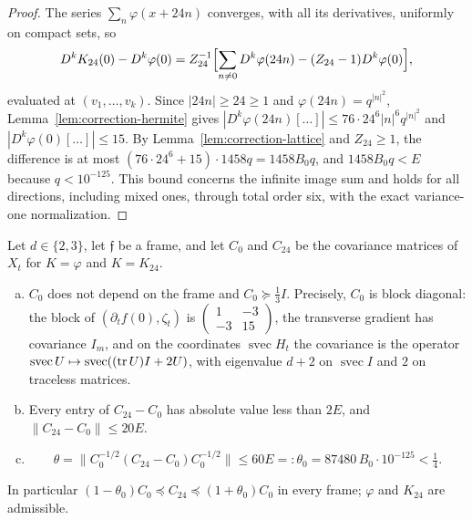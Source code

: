 \begin{proof}
The series $\sum_n\varphi(x+24n)$ converges, with all its derivatives, uniformly on compact sets, so
\[
D^kK_{24}(0)-D^k\varphi(0)=Z_{24}^{-1}\Bigl[\sum_{n\ne0}D^k\varphi(24n)-(Z_{24}-1)D^k\varphi(0)\Bigr],
\]
evaluated at $(v_1,\dots,v_k)$. Since $|24n|\ge24\ge1$ and $\varphi(24n)=q^{|n|^2}$, Lemma~\ref{lem:correction-hermite} gives $|D^k\varphi(24n)[\dots]|\le76\cdot24^6|n|^6q^{|n|^2}$ and $|D^k\varphi(0)[\dots]|\le15$. By Lemma~\ref{lem:correction-lattice} and $Z_{24}\ge1$, the difference is at most $(76\cdot24^6+15)\cdot1458q=1458B_0q$, and $1458B_0q<E$ because $q<10^{-125}$. This bound concerns the infinite image sum and holds for all directions, including mixed ones, through total order six, with the exact variance-one normalization.
\end{proof}

\begin{lemma}\label{lem:correction-cov}
Let $d\in\{2,3\}$, let $\mathfrak f$ be a frame, and let $C_0$ and $C_{24}$ be the covariance matrices of $X_t$ for $K=\varphi$ and $K=K_{24}$.
\begin{enumerate}[(a)]
\item $C_0$ does not depend on the frame and $C_0\succcurlyeq\frac13I$. Precisely, $C_0$ is block diagonal: the block of $(\partial_tf(0),\zeta_t)$ is $\left(\begin{smallmatrix}1&-3\\-3&15\end{smallmatrix}\right)$, the transverse gradient has covariance $I_m$, and on the coordinates $\operatorname{svec}H_t$ the covariance is the operator $\operatorname{svec}U\mapsto\operatorname{svec}((\operatorname{tr} U)I+2U)$, with eigenvalue $d+2$ on $\operatorname{svec}I$ and $2$ on traceless matrices.
\item Every entry of $C_{24}-C_0$ has absolute value less than $2E$, and $\|C_{24}-C_0\|\le20E$.
\item
\begin{equation}\label{eq:correction-theta}
\theta=\bigl\|C_0^{-1/2}(C_{24}-C_0)C_0^{-1/2}\bigr\|\le60E=:\theta_0=87480\,B_0\cdot10^{-125}<\tfrac14 .
\end{equation}
\end{enumerate}
In particular $(1-\theta_0)C_0\preccurlyeq C_{24}\preccurlyeq(1+\theta_0)C_0$ in every frame; $\varphi$ and $K_{24}$ are admissible.
\end{lemma}


